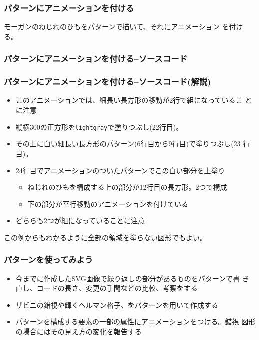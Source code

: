 \begin{frame}[containsverbatim]
 \frametitle{パターンにアニメーションを付ける}
 モーガンのねじれのひもをパターンで描いて、それにアニメーション
 を付ける。
\end{frame}
\begin{frame}[containsverbatim]
 \frametitle{パターンにアニメーションを付ける--ソースコード}
 \end{frame}
\begin{frame}[containsverbatim]
 \frametitle{パターンにアニメーションを付ける--ソースコード(解説)}
\begin{itemize}
 \item このアニメーションでは、細長い長方形の移動が2行で組になっているこ
			 とに注意
 \item 縦横300の正方形を\texttt{lightgray}で塗りつぶし(22行目)。
 \item その上に白い細長い長方形のパターン(6行目から9行目)で塗りつぶし(23
			 行目)。
 \item 24行目でアニメーションのついたパターンでこの白い部分を上塗り
			 \begin{itemize}
				\item ねじれのひもを構成する上の部分が12行目の長方形。2つで構成
				\item 下の部分が平行移動のアニメーションを付けている
			 \end{itemize}
 \item どちらも2つが組になっていることに注意
\end{itemize}
 この例からもわかるように全部の領域を塗らない図形でもよい。
\end{frame}
\begin{frame}[containsverbatim]
 \frametitle{パターンを使ってみよう}
 \begin{itemize}
  \item 今までに作成したSVG画像で繰り返しの部分があるものをパターンで書
        き直し、コードの長さ、変更の手間などの比較、考察をする
  \item ザビニの錯視や輝くヘルマン格子、をパターンを用いて作成する
  \item パターンを構成する要素の一部の属性にアニメーションをつける。錯視
        図形の場合にはその見え方の変化を報告する
 \end{itemize}
\end{frame}

\begin{frame}[containsverbatim]
\frametitle{}
\end{frame}

